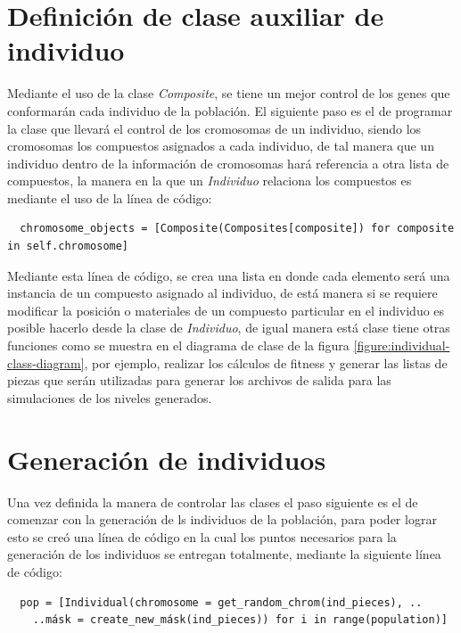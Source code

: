 \section{Definición de clase auxiliar de individuo}
\label{section:definition_of_clases}

Mediante el uso de la clase \textit{Composite}, se tiene un mejor control de los genes
que conformarán cada individuo de la población. El siguiente paso es el de 
programar la clase que llevará el control de los cromosomas de un individuo, 
siendo los cromosomas los compuestos asignados a cada individuo, de tal manera que un individuo
dentro de la información de cromosomas hará referencia a otra lista de
compuestos, la manera en la que un \textit{Individuo} relaciona los compuestos es
mediante el uso de la línea de código:

\begin{verbatim}
  chromosome_objects = [Composite(Composites[composite]) for composite in self.chromosome]
\end{verbatim}

Mediante esta línea de código, se crea una lista en donde
cada elemento será una instancia de un compuesto asignado al individuo, de está
manera si se requiere modificar la posición o materiales de un compuesto
particular en el individuo es posible hacerlo desde la clase de
\textit{Individuo}, de igual manera está clase tiene otras funciones 
como se muestra en el diagrama de clase de la figura
\ref{figure:individual-class-diagram}, por ejemplo, realizar los cálculos de fitness y generar
las listas de piezas que serán utilizadas para generar los archivos de salida
para las simulaciones de los niveles generados.

\section{Generación de individuos}
\label{section:ind_generation}

Una vez definida la manera de controlar las clases el paso siguiente es el de
comenzar con la generación de ls individuos de la población, para poder lograr
esto se creó una línea de código en la cual los puntos necesarios para la
generación de los individuos se entregan totalmente, mediante la siguiente 
línea de código: 

\begin{verbatim}
  pop = [Individual(chromosome = get_random_chrom(ind_pieces), ..
    ..másk = create_new_másk(ind_pieces)) for i in range(population)]
\end{verbatim}

